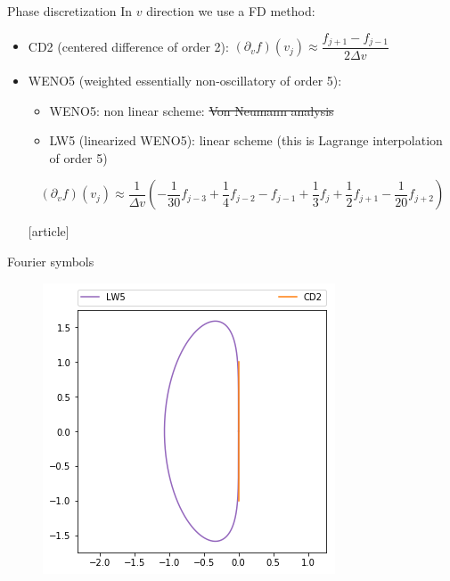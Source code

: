 \documentclass{beamer}
\newcommand{\customcite}[1]{\cite{#1}}
\begin{document}
\begin{frame}{Phase discretization}
  In $v$ direction we use a FD method:
  \begin{itemize}
    \item CD2 (centered difference of order 2): $(\partial_v f)(v_j)\approx \dfrac{f_{j+1}-f_{j-1}}{2\Delta v}$
    \item WENO5 (weighted essentially non-oscillatory of order 5):
      \begin{itemize}
        \item WENO5: non linear scheme: \st{Von Neumann analysis}
        \item LW5 (linearized WENO5): linear scheme (this is Lagrange interpolation of order 5)
      \end{itemize}
      $$
        (\partial_vf)(v_j)\approx\frac{1}{\Delta v}\left(-\frac{1}{30}f_{j-3} + \frac{1}{4}f_{j-2} - f_{j-1} + \frac{1}{3}f_j + \frac{1}{2}f_{j+1} - \frac{1}{20}f_{j+2}\right)
      $$

\begin{thebibliography}{9}
  [article]
   \customcite{Wang:2007}
   \customcite{Motamed:2010}
\end{thebibliography}

  \end{itemize}
\end{frame}
\begin{frame}{Fourier symbols}
  \begin{figure}\centering
    \includegraphics[height=0.8\textheight]{img/weno.png}
  \end{figure}
\end{frame}
\end{document}
